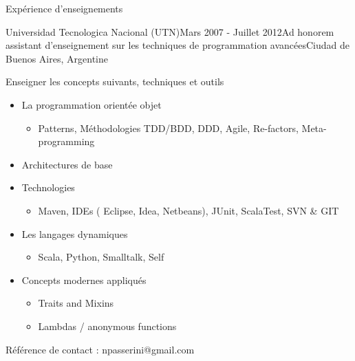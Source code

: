 \documentclass{resume} %
\begin{document}
\begin{rSection}{Exp\'{e}rience d'enseignements}
\begin{rSubsection}{Universidad Tecnologica Nacional (UTN)}{Mars 2007 - Juillet 2012}{Ad honorem assistant d'enseignement sur les techniques de programmation avanc\'{e}es}{Ciudad de Buenos Aires, Argentine}
\item Enseigner les concepts suivants, techniques et outils
\begin{itemize}
	\item La programmation orient\'{e}e objet
	\begin{itemize}
		\item Patterns, M\'ethodologies TDD/BDD, DDD, Agile, Re-factors, Meta-programming
	\end{itemize}
	\item Architectures de base
	\item Technologies
	\begin{itemize}
		\item Maven, IDEs ( Eclipse, Idea, Netbeans), JUnit, ScalaTest, SVN \& GIT
	\end{itemize}
	\item Les langages dynamiques
	\begin{itemize}
		\item  Scala, Python, Smalltalk, Self
	\end{itemize}
	\item Concepts modernes appliqu\'{e}s
	\begin{itemize}
		\item Traits and Mixins
		\item  Lambdas / anonymous functions
	\end{itemize}
\end{itemize}
\item R\'{e}f\'{e}rence de contact : npasserini@gmail.com
\end{rSubsection}


\end{rSection}
\end{document}
